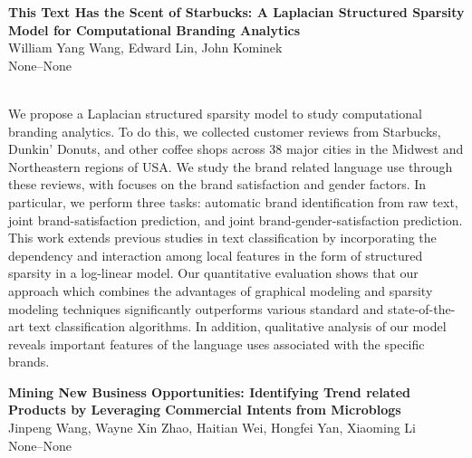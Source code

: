 \documentclass[twoside,makeidx]{book}
\begin{document}
\par\vspace{2em}\noindent%
\begin{minipage}{\linewidth}%
\begin{center}
\textbf{\normalsize This Text Has the Scent of Starbucks: A Laplacian Structured Sparsity Model for Computational Branding Analytics}\\
\normalsize  William Yang Wang,  Edward Lin,  John Kominek\\
{\small None--None}\\
\end{center}
\end{minipage}\\[0.5em]
\nopagebreak%
\noindent%
{\small We propose a Laplacian structured sparsity model to study computational branding analytics. To do this, we collected customer reviews from Starbucks, Dunkin' Donuts, and other coffee shops across 38 major cities in the Midwest and Northeastern regions of USA. We study the brand related language use through these reviews, with focuses on the brand satisfaction and gender factors. In particular, we perform three tasks: automatic brand identification from raw text, joint brand-satisfaction prediction, and joint brand-gender-satisfaction prediction. This work extends previous studies in text classification by incorporating the dependency and interaction among local features in the form of structured sparsity in a log-linear model. Our quantitative evaluation shows that our approach which combines the advantages of graphical modeling and sparsity modeling techniques significantly outperforms various standard and state-of-the-art text classification algorithms. In addition, qualitative analysis of our model reveals important features of the language uses associated with the specific brands.}
\par\vspace{2em}\noindent%
\begin{minipage}{\linewidth}%
\begin{center}
\textbf{\normalsize Mining New Business Opportunities: Identifying Trend related Products by Leveraging Commercial Intents from Microblogs}\\
\normalsize  Jinpeng Wang,  Wayne Xin Zhao,  Haitian Wei,  Hongfei Yan,  Xiaoming Li\\
{\small None--None}\\
\end{center}
\end{minipage}\\[0.5em]
\end{document}
